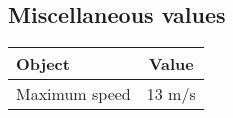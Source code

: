 \subsection{Miscellaneous values}
\begin{center}
\begin{tabular}{| l | c |}
\hline
Object & Value \\
\hline
Maximum speed & 13 m/s \\
\hline
\end{tabular}
\end{center}

